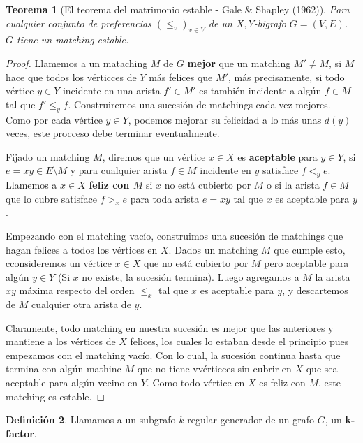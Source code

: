 \documentclass[12pt]{report}
\theoremstyle{plain}
\newtheorem{theorem}{Teorema}[section]
\theoremstyle{definition}
\newtheorem{definition}[theorem]{Definición}
\begin{document}
\begin{theorem}[El teorema del matrimonio estable - Gale \& Shapley (1962)]
Para cualquier conjunto de preferencias $(\leq_v)_{v \in V}$ de un $X,Y$-bigrafo $G = (V,E)$. $G$ tiene un matching estable.
\end{theorem}
\begin{proof}
Llamemos a un mataching $M$ de $G$ \textbf{mejor} que un matching $M' \neq M$, si $M$ hace que todos los vérticces de $Y$ más felices que $M'$, más precisamente, si todo vértice $y \in Y$ incidente en una arista $f' \in M'$ es también incidente a algún $f \in M$ tal que $f' \leq_y f$. Construiremos una sucesión de matchings cada vez mejores. Como por cada vértice $y \in Y$, podemos mejorar su felicidad a lo más unas $d(y)$ veces, este procceso debe terminar eventualmente.

Fijado un matching $M$, diremos que un vértice $x \in X$ es \textbf{aceptable} para $y \in Y$, si $e = xy \in E \setminus M$ y para cualquier arista $f \in M$ incidente en $y$ satisface $f <_y e$. Llamemos a $x \in X$ \textbf{feliz con $M$} si $x$ no está cubierto por $M$ o si la arista $f \in M$ que lo cubre satisface $f >_x e$ para toda arista $e = xy$ tal que $x$ es aceptable para $y$.

Empezando con el matching vacío, construimos una sucesión de matchings que hagan felices a todos los vértices en $X$. Dados un matching $M$ que cumple esto, cconsideremos un vértice $x \in X$ que no está cubierto por $M$ pero aceptable para algún $y \in Y$ (Si $x$ no existe, la sucesión termina). Luego agregamos a $M$ la arista $xy$ máxima respecto del orden $\leq_x$ tal que $x$ es aceptable para $y$, y descartemos de $M$ cualquier otra arista de $y$.

Claramente, todo matching en nuestra sucesión es mejor que las anteriores y mantiene a los vértices de $X$ felices, los cuales lo estaban desde el principio pues empezamos con el matching vacío. Con lo cual, la sucesión continua hasta que termina con algún mathinc $M$ que no tiene vvérticces sin cubrir en $X$ que sea aceptable para algún vecino en $Y$. Como todo vértice en $X$ es feliz con $M$, este matching es estable.
\end{proof}


\begin{definition}
Llamamos a un subgrafo $k$-regular generador de un grafo $G$, un \textbf{k-factor}.
\end{definition}
\end{document}
